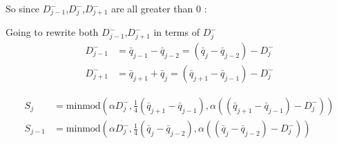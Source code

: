 \documentclass[10pt]{article}
\begin{document}
So since $D^-_{j-1}$,$D^-_{j}$,$D^-_{j+1}$ are all greater than $0$ :

Going to rewrite both  $D^-_{j-1}$,$D^-_{j+1}$  in terms of $D^-_{j}$
\begin{align}
D^-_{j-1} &= \bar{q}_{j-1} -\bar{q}_{j-2} = \left(\bar{q}_{j} -\bar{q}_{j-2}\right) - D^-_{j} \\
D^-_{j+1} &= \bar{q}_{j+1} + \bar{q}_{j}  = \left(\bar{q}_{j+1} -\bar{q}_{j-1}\right) - D^-_{j} 
\end{align}

\begin{align}
S_j &= \text{minmod}\left(\alpha D^-_j, \frac{1}{4}\left(\bar{q}_{j+1} -\bar{q}_{j-1}\right),\alpha \left(\left(\bar{q}_{j+1} -\bar{q}_{j-1}\right) - D^-_{j} \right)\right) \\
S_{j-1} &= \text{minmod}\left(  \alpha D^-_{j} , \frac{1}{4}\left(\bar{q}_{j} -\bar{q}_{j-2}\right), \alpha \left(\left(\bar{q}_{j} -\bar{q}_{j-2}\right) - D^-_{j}\right)\right)
\end{align}
\end{document}
